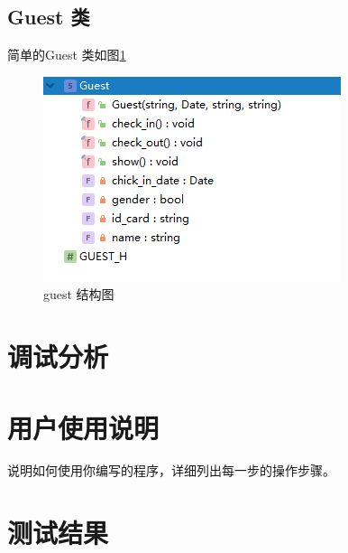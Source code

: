 \documentclass[UTF8]{ctexart}
\begin{document}
  \subsection{Guest 类}
    简单的Guest 类如图\ref{fig:structure_guest}
    \begin{figure}[H]
        \centering
        \includegraphics[scale = 1]{structure_guest.png}
        \caption{guest 结构图}
        \label{fig:structure_guest}
      \end{figure}
\section{调试分析}


\section{用户使用说明}
  说明如何使用你编写的程序，详细列出每一步的操作步骤。
\section{测试结果}
\end{document}
